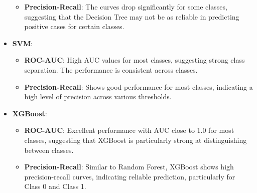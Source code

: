 \documentclass[12pt]{report}
\begin{document}
\begin{itemize}
\begin{itemize}
        \item \textbf{Precision-Recall}: The curves drop significantly for some classes, suggesting that the Decision Tree may not be as reliable in predicting positive cases for certain classes.
			\end{itemize}
		\item \textbf{SVM}:
		\vspace{-1.25em}	
		\begin{itemize}
				\setlength\itemsep{-1.5em}
        \item \textbf{ROC-AUC}: High AUC values for most classes, suggesting strong class separation. The performance is consistent across classes.
        \item \textbf{Precision-Recall}: Shows good performance for most classes, indicating a high level of precision across various thresholds.
			\end{itemize}
		\item \textbf{XGBoost}:
		\vspace{-1.25em}	
		\begin{itemize}
				\setlength\itemsep{-1.5em}
        \item \textbf{ROC-AUC}: Excellent performance with AUC close to 1.0 for most classes, suggesting that XGBoost is particularly strong at distinguishing between classes.
        \item \textbf{Precision-Recall}: Similar to Random Forest, XGBoost shows high precision-recall curves, indicating reliable prediction, particularly for Class 0 and Class 1.
    \end{itemize}
\end{itemize}
\end{document}
